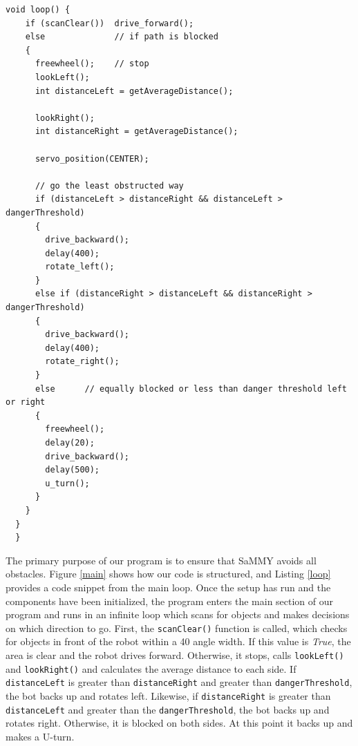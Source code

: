 \documentclass[11pt]{article}
\begin{document}
\par\noindent

\newpage

 \begin{lstlisting}[caption=Control Loop, label=loop]		
  void loop() {
    if (scanClear())  drive_forward(); 
    else              // if path is blocked
    {
      freewheel();    // stop
      lookLeft();
      int distanceLeft = getAverageDistance();

      lookRight();
      int distanceRight = getAverageDistance();
      
      servo_position(CENTER);

      // go the least obstructed way
      if (distanceLeft > distanceRight && distanceLeft > dangerThreshold)       
      {
        drive_backward();
        delay(400);
        rotate_left();
      }
      else if (distanceRight > distanceLeft && distanceRight > dangerThreshold) 
      {
        drive_backward();
        delay(400);
        rotate_right();
      }
      else 		// equally blocked or less than danger threshold left or right
      {
        freewheel();
        delay(20);
        drive_backward();
        delay(500);
        u_turn();
      }   
    } 
  }  
  }
  \end{lstlisting}



The primary purpose of our program is to ensure that SaMMY avoids all obstacles. Figure \ref{main} shows how our code is structured, and Listing \ref{loop} provides a code snippet from the main loop.
Once the setup has run and the components have been initialized, the program enters the main section of our program and runs in an infinite loop which scans for objects and makes decisions on which direction to go. First, the \texttt{scanClear()} function is called, which checks for objects in front of the robot within a 40\degree \hspace{1pt} angle width. If this value is \emph{True}, the area is clear and the robot drives forward. Otherwise, it stops, calls \texttt{lookLeft()} and \texttt{lookRight()} and calculates the average distance to each side. If \texttt{distanceLeft} is greater than \texttt{distanceRight} and greater than \texttt{dangerThreshold}, the bot backs up and rotates left. Likewise, if \texttt{distanceRight} is greater than \texttt{distanceLeft} and greater than the \texttt{dangerThreshold}, the bot backs up and rotates right. Otherwise, it is blocked on both sides. At this point it backs up and makes a U-turn.
\end{document}
